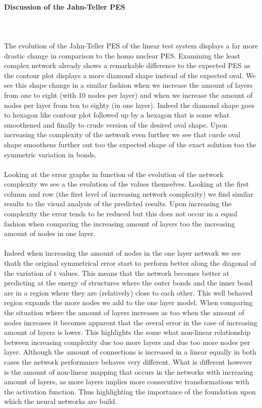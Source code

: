 \documentclass[]{article}
\begin{document}
\paragraph{Discussion of the Jahn-Teller PES}
\\
\\
The evolution of the Jahn-Teller PES of the linear test system displays a far more drastic change in comparison to the homo nuclear PES. Examining the least complex network already shows a remarkable difference to the expected PES as the contour plot displays a more diamond shape instead of the expected oval. We see this shape change in a similar fashion when we increase the amount of layers from one to eight (with 10 nodes per layer) and when we increase the amount of nodes per layer from ten to eighty (in one layer). Indeed the diamond shape goes to hexagon like contour plot followed up by a hexagon that is some what smoothened and finally to crude version of the desired oval shape. Upon increasing the complexity of the network even further we see that curde oval shape smoothens further out too the expected shape of the exact solution too the symmetric variation in bonds. 
\\
\\
Looking at the error graphs in function of the evolution of the network complexity we see a the evolution of the values themselves. Looking at the first column and row (the first level of increasing network complexity) we find similar results to the visual analysis of the predicted results. Upon increasing the complexity the error tends to be reduced but this does not occur in a equal fashion when comparing the increasing amount of layers too the increasing amount of nodes in one layer. 
\\
\\
Indeed when increasing the amount of nodes in the one layer network we see thath the original symmetrical error start to perform better along the diagonal of the variation of t values. This means that the network becomes better at predicting at the energy of structures where the outer bonds and the inner bond are in a region where they are (relatively) close to each other. This well behaved region expands the more nodes we add to the one layer model. When comparing the situation where the amount of layers increases as too when the amount of nodes increases it becomes apparent that the overal error in the case of increasing amount of layers is lower. This highlights the some what non-linear relationship between increasing complexity due too more layers and due too more nodes per layer. Although the amount of connections is increased in a linear equally in both cases the network performance behaves very different. What is different however is the amount of non-linear mapping that occurs in the networks with increasing amount of layers, as more layers implies more consecutive transformations with the activation function. Thus highlighting the importance of the foundation upon which the neural networks are build.
\end{document}
